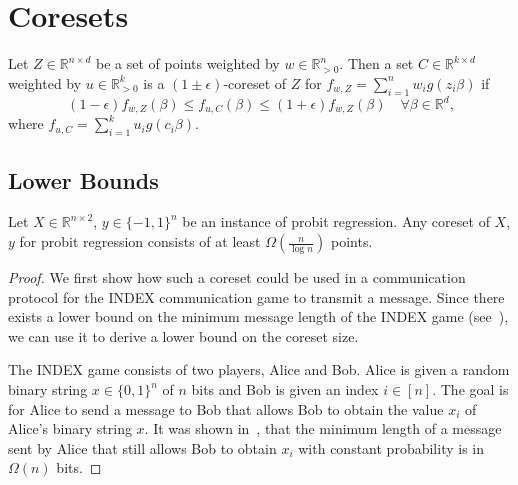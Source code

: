 \section{Coresets}

\begin{definition}
    Let $Z \in \mathbb{R}^{n \times d}$ be a set of points weighted by
    $w \in \mathbb{R}^n_{>0}$.
    Then a set $C \in \mathbb{R}^{k \times d}$ weighted
    by $u \in \mathbb{R}^k_{>0}$ is a $(1 \pm \epsilon)$-coreset
    of $Z$ for $f_{w, Z} = \sum_{i=1}^n w_i g(z_i \beta)$ if
    \begin{equation*}
        \ (1 - \epsilon)f_{w, Z}(\beta)
        \leq f_{u, C}(\beta) \leq (1 + \epsilon)f_{w, Z}(\beta)
        \quad \forall \beta \in \mathbb{R}^d,
    \end{equation*}
    where $f_{u, C} = \sum_{i=1}^k u_i g(c_i \beta)$.
\end{definition}

\subsection{Lower Bounds}

\begin{theorem}
    Let $X \in \mathbb{R}^{n \times 2}$, $y \in \{-1, 1\}^n$ be an
    instance of probit regression.
    Any coreset of $X$, $y$ for probit regression consists of
    at least $\Omega\left(\frac{n}{\log{n}}\right)$ points.
\end{theorem}
\begin{proof}
    We first show how such a coreset could be used in a
    communication protocol for the INDEX communication game
    to transmit a message.
    Since there exists a lower bound on the minimum
    message length of the INDEX game (see~\cite{index}),
    we can use it to derive a lower bound on the
    coreset size.

    The INDEX game consists of two players, Alice and Bob.
    Alice is given a random binary string $x \in \{0, 1\}^n$ of $n$ bits
    and Bob is given an index $i \in [n]$.
    The goal is for Alice to send a message to Bob that allows
    Bob to obtain the value $x_i$ of Alice's binary string $x$.
    It was shown in~\cite{index}, that the minimum length of a message
    sent by Alice that still allows Bob to obtain $x_i$ with
    constant probability is in $\Omega(n)$ bits.
\end{proof}